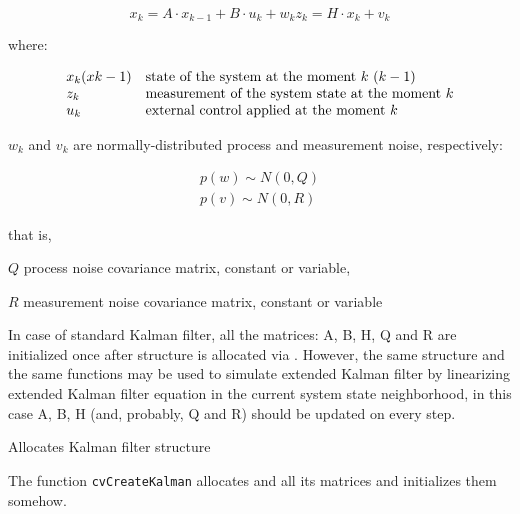 \[
x_k=A \cdot x_{k-1}+B \cdot u_k+w_k
z_k=H \cdot x_k+v_k
\]

where:

\[
\begin{array}{l l}
x_k (x{k-1}) & \text{state of the system at the moment $k$ $(k-1)$ }\\
z_k & \text{measurement of the system state at the moment $k$}\\
u_k & \text{external control applied at the moment $k$}
\end{array}
\]

$w_k$ and $v_k$ are normally-distributed process and measurement noise, respectively:

\[
\begin{array}{l}
p(w) \sim N(0,Q)\\
p(v) \sim N(0,R)
\end{array}
\]

that is,

$Q$ process noise covariance matrix, constant or variable,

$R$ measurement noise covariance matrix, constant or variable

In case of standard Kalman filter, all the matrices: A, B, H, Q and R are initialized once after  structure is allocated via . However, the same structure and the same functions may be used to simulate extended Kalman filter by linearizing extended Kalman filter equation in the current system state neighborhood, in this case A, B, H (and, probably, Q and R) should be updated on every step.

\label{CreateKalman}

Allocates Kalman filter structure


\begin{description}
\end{description}

The function \texttt{cvCreateKalman} allocates  and all its matrices and initializes them somehow.

